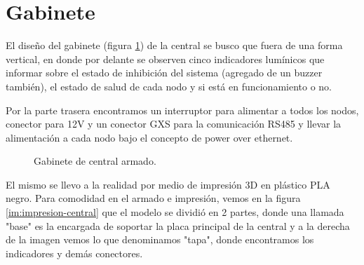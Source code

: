 \section{Gabinete}
\par El diseño del gabinete (figura \ref{im:gabinete-central}) de la central se busco que fuera de una forma vertical, en donde por delante se observen cinco indicadores lumínicos que informar sobre el estado de inhibición del sistema (agregado de un buzzer también), el estado de salud de cada nodo y si está en funcionamiento o no.
\par Por la parte trasera encontramos un interruptor para alimentar a todos los nodos, conector para 12V y un conector GXS para la comunicación RS485 y llevar la alimentación a cada nodo bajo el concepto de power over ethernet. 
\begin{figure}[!h]
\begin{center}
    \caption{Gabinete de central armado.}
	\label{im:gabinete-central}
\end{center}
\end{figure}

\par El mismo se llevo a la realidad por medio de impresión 3D en plástico PLA negro. Para comodidad en el armado e impresión, vemos en la figura \ref{im:impresion-central} que el modelo se dividió en 2 partes, donde una llamada "base" es la encargada de soportar la placa principal de la central y a la derecha de la imagen vemos lo 
que denominamos "tapa", donde encontramos los indicadores y demás conectores. 


